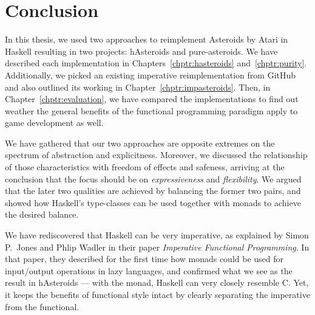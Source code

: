 \documentclass[
  digital, %
  color,   %
  table,   %
  oneside, %
  lof,     %
  lot,     %
]{fithesis3}
\begin{document}
{%





\chapter*{Conclusion}

In this thesis, we used two approaches to reimplement Asteroids by Atari in Haskell
resulting in two projects: hAsteroids and pure-asteroids.
We have described each implementation in Chapters~\ref{chptr:hasteroids} and~\ref{chptr:purity}.
Additionally, we picked an existing imperative reimplementation from GitHub and also
outlined its working in Chapter~\ref{chptr:impasteroids}.
Then, in Chapter~\ref{chptr:evaluation}, we have compared the implementations
to find out weather the general benefits of the functional programming paradigm
apply to game development as well.

We have gathered that our two approaches are opposite extremes on the spectrum
of abstraction and explicitness. Moreover, we discussed the relationship of those
characteristics with freedom of effects and safeness, arriving at the conclusion
that the focus should be on \emph{expressiveness} and \emph{flexibility}.
We argued that the later two qualities are achieved by balancing the former two pairs,
and showed how Haskell's type-classes can be used together with monads
to achieve the desired balance.

We have rediscovered that Haskell can be very imperative, as explained by Simon P.~Jones
and Phlip Wadler in their paper \textit{Imperative Functional Programming}.\cite{imperativefp}
In that paper, they described for the first time how monads could be used for input/output
operations in lazy languages, and confirmed what we see as the result in hAsteroids --- with the
 monad, Haskell can very closely resemble C. Yet, it keeps the
benefits of functional style intact by clearly separating the imperative from the functional.

}
\end{document}
